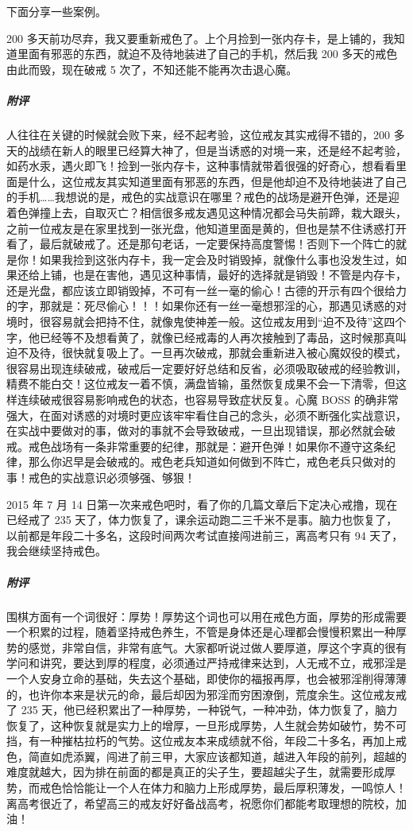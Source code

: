 下面分享一些案例。

\begin{case}
    200 多天前功尽弃，我又要重新戒色了。上个月捡到一张内存卡，是上铺的，我知道里面有邪恶的东西，就迫不及待地装进了自己的手机，然后我 200 多天的戒色由此而毁，现在破戒 5 次了，不知还能不能再次击退心魔。
    \subparagraph{附评} 人往往在关键的时候就会败下来，经不起考验，这位戒友其实戒得不错的，200 多天的战绩在新人的眼里已经算大神了，但是当诱惑的对境一来，还是经不起考验，如药水汞，遇火即飞！捡到一张内存卡，这种事情就带着很强的好奇心，想看看里面是什么，这位戒友其实知道里面有邪恶的东西，但是他却迫不及待地装进了自己的手机……我想说的是，戒色的实战意识在哪里？戒色的战场是避开色弹，还是迎着色弹撞上去，自取灭亡？相信很多戒友遇见这种情况都会马失前蹄，栽大跟头，之前一位戒友是在家里找到一张光盘，他知道里面是黄的，但也是禁不住诱惑打开看了，最后就破戒了。还是那句老话，一定要保持高度警惕！否则下一个阵亡的就是你！如果我捡到这张内存卡，我一定会及时销毁掉，就像什么事也没发生过，如果还给上铺，也是在害他，遇见这种事情，最好的选择就是销毁！不管是内存卡，还是光盘，都应该立即销毁掉，不可有一丝一毫的偷心！古德的开示有四个很给力的字，那就是：死尽偷心！！！如果你还有一丝一毫想邪淫的心，那遇见诱惑的对境时，很容易就会把持不住，就像鬼使神差一般。这位戒友用到“迫不及待”这四个字，他已经等不及想看黄了，就像已经戒毒的人再次接触到了毒品，这时候那真叫迫不及待，很快就复吸上了。一旦再次破戒，那就会重新进入被心魔奴役的模式，很容易出现连续破戒，破戒后一定要好好总结和反省，必须吸取破戒的经验教训，精费不能白交！这位戒友一着不慎，满盘皆输，虽然恢复成果不会一下清零，但这样连续破戒很容易影响戒色的状态，也容易导致症状反复。心魔 BOSS 的确非常强大，在面对诱惑的对境时更应该牢牢看住自己的念头，必须不断强化实战意识，在实战中要做对的事，做对的事就不会导致破戒，一旦出现错误，那必然就会破戒。戒色战场有一条非常重要的纪律，那就是：避开色弹！如果你不遵守这条纪律，那么你迟早是会破戒的。戒色老兵知道如何做到不阵亡，戒色老兵只做对的事！戒色的实战意识必须够强、够狠！
\end{case}

\begin{case}
    2015 年 7 月 14 日第一次来戒色吧时，看了你的几篇文章后下定决心戒撸，现在已经戒了 235 天了，体力恢复了，课余运动跑二三千米不是事。脑力也恢复了，以前都是年段二十多名，这段时间两次考试直接闯进前三，离高考只有 94 天了，我会继续坚持戒色。
    \subparagraph{附评} 围棋方面有一个词很好：厚势！厚势这个词也可以用在戒色方面，厚势的形成需要一个积累的过程，随着坚持戒色养生，不管是身体还是心理都会慢慢积累出一种厚势的感觉，非常自信，非常有底气。大家都听说过做人要厚道，厚这个字真的很有学问和讲究，要达到厚的程度，必须通过严持戒律来达到，人无戒不立，戒邪淫是一个人安身立命的基础，失去这个基础，即使你的福报再厚，也会被邪淫削得薄薄的，也许你本来是状元的命，最后却因为邪淫而穷困潦倒，荒度余生。这位戒友戒了 235 天，他已经积累出了一种厚势，一种锐气，一种冲劲，体力恢复了，脑力恢复了，这种恢复就是实力上的增厚，一旦形成厚势，人生就会势如破竹，势不可挡，有一种摧枯拉朽的气势。这位戒友本来成绩就不俗，年段二十多名，再加上戒色，简直如虎添翼，闯进了前三甲，大家应该都知道，越进入年段的前列，超越的难度就越大，因为排在前面的都是真正的尖子生，要超越尖子生，就需要形成厚势，而戒色恰恰能让一个人在体力和脑力上形成厚势，最后厚积薄发，一鸣惊人！离高考很近了，希望高三的戒友好好备战高考，祝愿你们都能考取理想的院校，加油！
\end{case}


